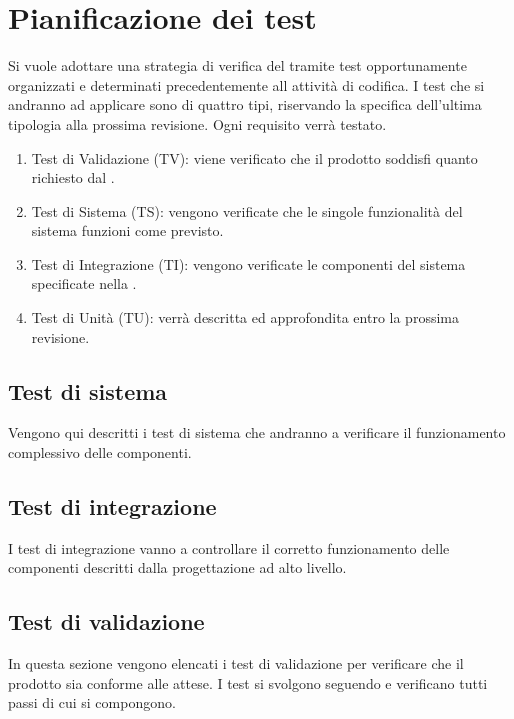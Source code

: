 \pagebreak
\section{Pianificazione dei test}
Si vuole adottare una strategia di verifica del  tramite test opportunamente organizzati e determinati precedentemente all attività di codifica. I test che si andranno ad applicare sono di quattro tipi, riservando la specifica dell'ultima tipologia alla prossima revisione. Ogni requisito verrà testato.

\begin{enumerate}
	\item Test di Validazione (TV): viene verificato che il prodotto soddisfi quanto richiesto dal .
	\item Test di Sistema (TS): vengono verificate che le singole funzionalità del sistema funzioni come previsto.
	\item Test di Integrazione (TI): vengono verificate le componenti del sistema specificate nella \SpecificaTecnica{}.
	\item Test di Unità (TU): verrà descritta ed approfondita entro la prossima revisione.
\end{enumerate}

	
	\subsection{Test di sistema}
	Vengono qui descritti i test di sistema che andranno a verificare il funzionamento complessivo delle componenti.
	
	
	\subsection{Test di integrazione}
	I test di integrazione vanno a controllare il corretto funzionamento delle componenti descritti dalla progettazione ad alto livello. 
	

	\subsection{Test di validazione}
	In questa sezione vengono elencati i test di validazione per verificare che il prodotto sia conforme alle attese. I test si svolgono seguendo e verificano tutti passi di cui si compongono. 
	
	
	
	
	
